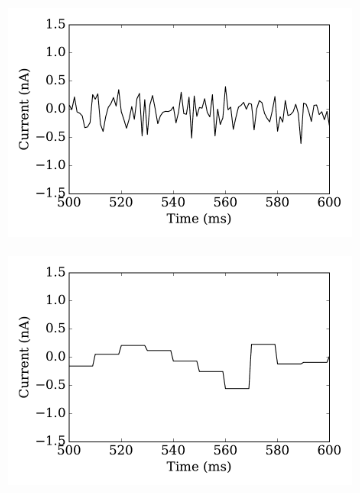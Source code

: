 		
	\begin{figure}[tbp!]
		\centering
		\par
		\begin{subfigure}[t]{0.43\textwidth}
			\includegraphics[width=\textwidth]{pics_iconip/curr_dt1.pdf}
			\caption{}
		\end{subfigure}
		\begin{subfigure}[t]{0.43\textwidth}
			\includegraphics[width=\textwidth]{pics_iconip/curr_dt10.pdf}
			\caption{}
		\end{subfigure}\\
		\begin{subfigure}[t]{0.43\textwidth}

\end{subfigure}
\end{figure}
